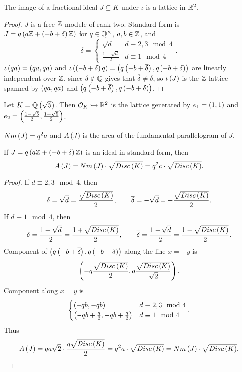 \begin{lemma}
The image of a fractional ideal $ J \subsetneq K $ under $ \iota $ is a lattice in $ \mathbb{R}^2 $.
\end{lemma}

\begin{proof}
$ J $ is a free $ \mathbb{Z} $-module of rank two. Standard form is $ J = q\left( a\mathbb{Z} + \left( -b + \delta \right)\mathbb{Z} \right) $ for $ q \in \mathbb{Q}^\times $, $ a, b \in \mathbb{Z} $, and
$$ \delta =
\begin{cases}
\sqrt{d} & d \equiv 2, 3 \mod 4 \\
\tfrac{1 + \sqrt{d}}{2} & d \equiv 1 \mod 4
\end{cases}.
$$
$ \iota\left( qa \right) = \left( qa, qa \right) $ and $ \iota\left( \left( -b + \delta \right)q \right) = \left( q\left( -b + \overline{\delta} \right), q\left( -b + \delta \right) \right) $ are linearly independent over $ \mathbb{Z} $, since $ \delta \notin \mathbb{Q} $ gives that $ \overline{\delta} \ne \delta $, so $ \iota\left( J \right) $ is the $ \mathbb{Z} $-lattice spanned by $ \left( qa, qa \right) $ and $ \left( q\left( -b + \overline{\delta} \right), q\left( -b + \delta \right) \right) $.
\end{proof}

\begin{example*}
Let $ K = \mathbb{Q}\left( \sqrt{5} \right) $. Then $ \mathcal{O}_K \hookrightarrow \mathbb{R}^2 $ is the lattice generated by $ e_1 = \left( 1, 1 \right) $ and $ e_2 = \left( \tfrac{1 - \sqrt{5}}{2}, \tfrac{1 + \sqrt{5}}{2} \right) $.
\end{example*}

\pagebreak

$ Nm\left( J \right) = q^2a $ and $ A\left( J \right) $ is the area of the fundamental parallelogram of $ J $.

\begin{proposition}
If $ J = q\left( a\mathbb{Z} + \left( -b + \delta \right)\mathbb{Z} \right) $ is an ideal in standard form, then
$$ A\left( J \right) = Nm\left( J \right) \cdot \sqrt{Disc\left( K \right)} = q^2a \cdot \sqrt{Disc\left( K \right)}. $$
\end{proposition}

\begin{proof}
If $ d \equiv 2, 3 \mod 4 $, then
$$ \delta = \sqrt{d} = \dfrac{\sqrt{Disc\left( K \right)}}{2}, \qquad \overline{\delta} = -\sqrt{d} = -\dfrac{\sqrt{Disc\left( K \right)}}{2}. $$
If $ d \equiv 1 \mod 4 $, then
$$ \delta = \dfrac{1 + \sqrt{d}}{2} = \dfrac{1 + \sqrt{Disc\left( K \right)}}{2}, \qquad \overline{\delta} = \dfrac{1 - \sqrt{d}}{2} = \dfrac{1 - \sqrt{Disc\left( K \right)}}{2}. $$
Component of $ \left( q\left( -b + \overline{\delta} \right), q\left( -b + \delta \right) \right) $ along the line $ x = -y $ is
$$ \left( -q\dfrac{\sqrt{Disc\left( K \right)}}{2}, q\dfrac{\sqrt{Disc\left( K \right)}}{\sqrt{2}} \right). $$
Component along $ x = y $ is
$$
\begin{cases}
\left( -qb, -qb \right) & d \equiv 2, 3 \mod 4 \\
\left( -qb + \tfrac{q}{2}, -qb + \tfrac{q}{2} \right) & d \equiv 1 \mod 4
\end{cases}.
$$
Thus
$$ A\left( J \right) = qa\sqrt{2} \cdot \dfrac{q\sqrt{Disc\left( K \right)}}{2} = q^2a \cdot \sqrt{Disc\left( K \right)} = Nm\left( J \right) \cdot \sqrt{Disc\left( K \right)}. $$
\end{proof}

